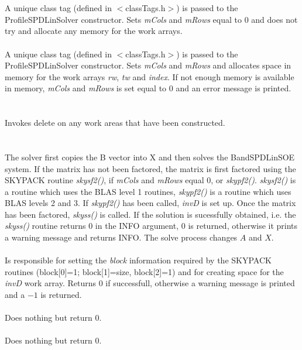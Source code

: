   \\
  \\
A unique class tag (defined in $<$classTags.h$>$) is passed to the
ProfileSPDLinSolver constructor. Sets {\em mCols} and {\em mRows}
equal to $0$ and does not try and allocate any memory for the work arrays.\\

  \\
A unique class tag (defined in $<$classTags.h$>$) is passed to the
ProfileSPDLinSolver constructor. Sets {\em mCols} and {\em mRows} and
allocates space in memory for the work arrays {\em rw}, {\em tw} and
{\em index}. If not enough memory is available in memory, {\em mCols}
and {\em mRows} is set equal to $0$ and an error message is printed. \\

 \\
\\ 
Invokes delete on any work areas that have been constructed. \\

  \\
 \\
The solver first copies the B vector into X and then solves the
BandSPDLinSOE system. If the matrix has not been factored, the matrix
is first factored using the SKYPACK routine {\em skysf2()}, if {\em
mCols} and {\em mRows} equal $0$, or {\em skypf2()}. {\em skysf2()} is
a routine which uses the BLAS level 1 routines, {\em skypf2()} is a
routine which uses BLAS levels 2 and 3. If {\em skypf2()}
has been called, {\em invD} is set up. Once the matrix has been
factored, {\em skyss()} is called. If the solution is sucessfully
obtained, i.e. the {\em skyss()} routine returns $0$ in the INFO
argument, $0$ is returned, otherwise it prints a warning message and
returns INFO. The solve process changes $A$ and $X$. \\   

 \\
Is responsible for setting the {\em block} information required by the
SKYPACK routines (block[0]=1; block[1]=size, block[2]=1) and for
creating space for the {\em invD} work array. Returns $0$ if
successfull, otherwise a warning message is printed and a $-1$ is
returned. \\

 \\ 
Does nothing but return $0$. \\

 \\ 
Does nothing but return $0$. \\







